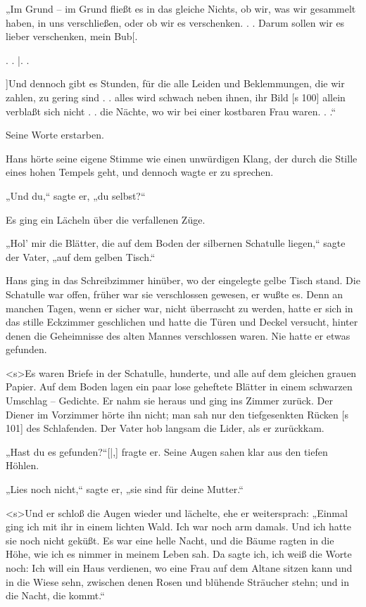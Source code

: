 „Im Grund – im Grund fließt es in das gleiche
Nichts, ob wir, was wir gesammelt haben, in uns
verschließen, oder ob wir es verschenken. . . Darum
sollen wir es lieber verschenken, mein Bub[.

. . |. .

]Und dennoch gibt es Stunden, für die alle
Leiden und Beklemmungen, die wir zahlen, zu gering
sind . . alles wird schwach neben ihnen, ihr Bild
[s 100]
allein verblaßt sich nicht . . die Nächte, wo wir bei
einer kostbaren Frau waren. . .“

Seine Worte erstarben.

Hans hörte seine eigene Stimme wie einen
unwürdigen Klang, der durch die Stille eines hohen
Tempels geht, und dennoch wagte er zu sprechen.

„Und du,“ sagte er, „du selbst?“

Es ging ein Lächeln über die verfallenen Züge.

„Hol' mir die Blätter, die auf dem Boden der
silbernen Schatulle liegen,“ sagte der Vater, „auf dem
gelben Tisch.“

Hans ging in das Schreibzimmer hinüber, wo
der eingelegte gelbe Tisch stand. Die Schatulle war
offen, früher war sie verschlossen gewesen, er wußte
es. Denn an manchen Tagen, wenn er sicher war,
nicht überrascht zu werden, hatte er sich in das stille
Eckzimmer geschlichen und hatte die Türen und
Deckel versucht, hinter denen die Geheimnisse des
alten Mannes verschlossen waren. Nie hatte er
etwas gefunden.

<s>Es waren Briefe in der Schatulle, hunderte, und
alle auf dem gleichen grauen Papier. Auf dem Boden
lagen ein paar lose geheftete Blätter in einem schwarzen
Umschlag – Gedichte. Er nahm sie heraus und
ging ins Zimmer zurück. Der Diener im Vorzimmer
hörte ihn nicht; man sah nur den tiefgesenkten Rücken
[s 101]
des Schlafenden. Der Vater hob langsam die Lider,
als er zurückkam.

„Hast du es gefunden?“[|,] fragte er. Seine Augen
sahen klar aus den tiefen Höhlen.

„Lies noch nicht,“ sagte er, „sie sind für deine
Mutter.“

<s>Und er schloß die Augen wieder und lächelte,
ehe er weitersprach: „Einmal ging ich mit ihr in einem
lichten Wald. Ich war noch arm damals. Und ich
hatte sie noch nicht geküßt. Es war eine helle Nacht,
und die Bäume ragten in die Höhe, wie ich es nimmer
in meinem Leben sah. Da sagte ich, ich weiß die
Worte noch: Ich will ein Haus verdienen, wo eine
Frau auf dem Altane sitzen kann und in die Wiese
sehn, zwischen denen Rosen und blühende Sträucher
stehn; und in die Nacht, die kommt.“

